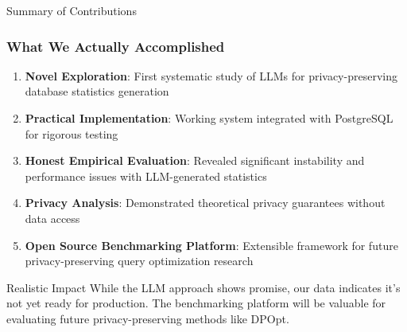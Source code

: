 \documentclass[smaller]{beamer}
\begin{document}
\begin{frame}{Summary of Contributions}
\frametitle{What We Actually Accomplished}

\begin{enumerate}
    \item \textbf{Novel Exploration}: First systematic study of LLMs for privacy-preserving database statistics generation
    
    \item \textbf{Practical Implementation}: Working system integrated with PostgreSQL for rigorous testing
    
    \item \textbf{Honest Empirical Evaluation}: Revealed significant instability and performance issues with LLM-generated statistics
    
    \item \textbf{Privacy Analysis}: Demonstrated theoretical privacy guarantees without data access
    
    \item \textbf{Open Source Benchmarking Platform}: Extensible framework for future privacy-preserving query optimization research
\end{enumerate}

\vspace{0.5cm}

\begin{alertblock}{Realistic Impact}
While the LLM approach shows promise, our data indicates it's not yet ready for production. The benchmarking platform will be valuable for evaluating future privacy-preserving methods like DPOpt.
\end{alertblock}

\end{frame}
\end{document}
